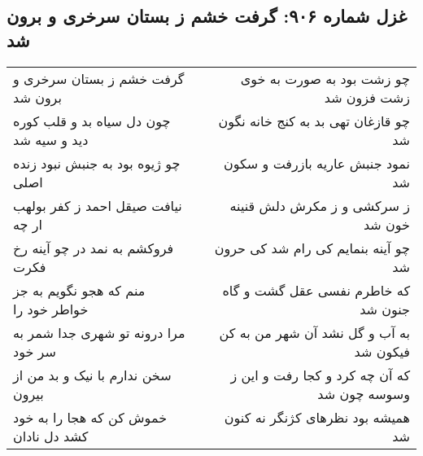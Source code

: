 \begin{center}
\section*{غزل شماره ۹۰۶: گرفت خشم ز بستان سرخری و برون شد}
\label{sec:0906}
\begin{longtable}{l p{0.5cm} r}
گرفت خشم ز بستان سرخری و برون شد
&&
چو زشت بود به صورت به خوی زشت فزون شد
\\
چون دل سیاه بد و قلب کوره دید و سیه شد
&&
چو قازغان تهی بد به کنج خانه نگون شد
\\
چو ژیوه بود به جنبش نبود زنده اصلی
&&
نمود جنبش عاریه بازرفت و سکون شد
\\
نیافت صیقل احمد ز کفر بولهب ار چه
&&
ز سرکشی و ز مکرش دلش قنینه خون شد
\\
فروکشم به نمد در چو آینه رخ فکرت
&&
چو آینه بنمایم کی رام شد کی حرون شد
\\
منم که هجو نگویم به جز خواطر خود را
&&
که خاطرم نفسی عقل گشت و گاه جنون شد
\\
مرا درونه تو شهری جدا شمر به سر خود
&&
به آب و گل نشد آن شهر من به کن فیکون شد
\\
سخن ندارم با نیک و بد من از بیرون
&&
که آن چه کرد و کجا رفت و این ز وسوسه چون شد
\\
خموش کن که هجا را به خود کشد دل نادان
&&
همیشه بود نظرهای کژنگر نه کنون شد
\\
\end{longtable}
\end{center}
